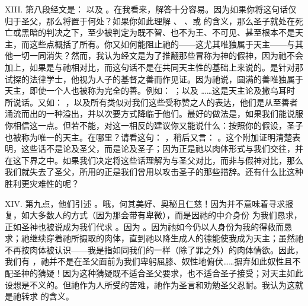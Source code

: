 XIII. 第八段经文是：  以及 。在我看来，解答十分容易。因为如果你将这句话仅归于圣父，那么将置于何处？如果你如此理解 、 、或 的含义，那么圣子就处在死亡或黑暗的判决之下，至少被判定为既不智、也不为王、不可见、甚至根本不是天主，而这些点概括了所有。你又如何能阻止祂的——这尤其唯独属于天主——与其他一切一同消失？然而，我认为经文是为了推翻那些冒称为神的假神，因为祂不会加上，如果是与祂相对比，而这句话不是在共同天主性的基础上来说的。是针对那试探的法律学士，他视为人子的基督之善而作见证。因为祂说，圆满的善唯独属于天主，即使一个人也被称为完全的善。例如： ；以及 ……这是天主论及撒乌耳时所说话。又如： ，以及所有类似对我们这些受称赞之人的表达，他们是从至善者涌流而出的一种溢出，并以次要方式降临于他们。最好的做法是，如果我们能说服你相信这一点。但若不能，对这一相反的建议你又能说什么：按照你的假设，圣子也被称为唯一的天主。在哪里？请看这句： ，稍后又言： 。这个附加证明清楚表明，这些话不是论及圣父，而是论及圣子；因为正是祂以肉体形式与我们交往，并在这下界之中。如果我们决定将这些话理解为与圣父对比，而非与假神对比，那么我们就失去了圣父，所用的正是我们曾用以攻击圣子的那些措辞。还有什么比这种胜利更灾难性的呢？\par

XIV. 第九点，他们引述 。哦，何其美好、奥秘且仁慈！因为并不意味着寻求报复，如大多数人的方式（因为那会带有卑微），而是因祂的中介身份  为我们恳求，正如圣神也被说成为我们代求 。因为 。因为祂如今仍以人身份为我的得救而恳求；祂继续穿着祂所摄取的肉体，直到祂以降生成人的德能使我成为天主；虽然祂不再按肉体被认识——我是指如同我们的一样（除了罪之外）的肉体情欲。因此，我们有 ，祂并不是在圣父面前为我们卑躬屈膝、奴性地俯伏……摒弃如此奴性且不配圣神的猜疑！因为这种猜疑既不适合圣父要求，也不适合圣子接受；对天主如此设想是不义的。但祂作为人所受的苦难，祂作为圣言和劝勉圣父忍耐。我认为这就是祂转求  的含义。\par

